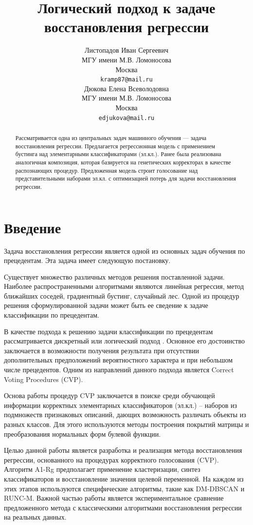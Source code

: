 \documentclass{article}
\title{Логический подход к задаче восстановления регрессии}
\author{Листопадов Иван Сергеевич \\
	МГУ имени М.В. Ломоносова\\
        Москва\\
	\texttt{kramp87@mail.ru} \\
	\And
	Дюкова Елена Всеволодовна \\
	МГУ имени М.В. Ломоносова\\
        Москва\\
	\texttt{edjukova@mail.ru} \\
}
\date{}
\begin{document}
\maketitle

\begin{abstract}
	Рассматривается одна из центральных задач машинного обучения — задача восстановления регрессии. Предлагается регрессионная модель с применением бустинга над элементарными классификаторами (эл.кл.). Ранее была реализована аналогичная композиция, которая базируется на генетических корректорах в качестве распознающих процедур. Предложенная модель строит голосование над представительными наборами эл.кл. с оптимизацией потерь для задачи восстановления регрессии.
\end{abstract}



\section{Введение}
    Задача восстановления регрессии является одной из основных задач обучения по прецедентам. Эта задача имеет следующую постановку.
    
    Существует множество различных методов решения поставленной задачи. Наиболее распространенными алгоритмами являются линейная регрессия, метод ближайших соседей, градиентный бустинг, случайный лес. Одной из процедур решения сформулированной задачи может быть ее сведение к задаче классификации по прецедентам.

    В качестве подхода к решению задачи классификации по прецедентам рассматривается дискретный или логический подход \cite{author8}. Основное его достоинство заключается в возможности получения результата при отсутствии дополнительных предположений вероятностного характера и при небольшом числе прецедентов. Одним из направлений данного подхода является Correct Voting Procedures (CVP).
    
    Основа работы \cite{author1, author2} процедур CVP заключается в поиске среди обучающей информации корректных элементарных классификаторов (эл.кл.) -- наборов из подмножеств признаковых описаний, дающих возможность различать объекты из разных классов. Для этого используются методы построения покрытий матрицы и преобразования нормальных форм булевой функции.

    Целью данной работы является разработка и реализация метода восстановления регрессии, основанного на процедурах корректного голосования (CVP). Алгоритм A1-Rg предполагает применение кластеризации, синтез классификаторов и восстановление значения целевой переменной. На каждом из этих этапов используются специфические алгоритмы, такие как DM-DBSCAN и RUNC-M. Важной частью работы является экспериментальное сравнение предложенного метода с классическими алгоритмами восстановления регрессии на реальных данных.
\end{document}
